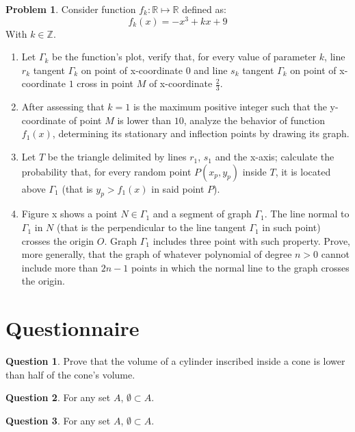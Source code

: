 \documentclass[a4paper,12pt,reqno]{amsart}
\theoremstyle{definition}
\newtheorem{problem}{Problem}
\newtheorem{quest}{Question}
\begin{document}
\begin{problem}
Consider function $f_k: \mathbb{R} \mapsto \mathbb{R}$ defined as:
\begin{equation}
f_k(x)=-x^3+kx+9
\end{equation}
With $k\in\mathbb{Z}$.
\begin{enumerate}
\item Let $\Gamma_k$ be the function's plot, verify that, for every value of parameter $k$, line $r_k$ tangent
$\Gamma_k$ on point of x-coordinate $0$ and line $s_k$ tangent $\Gamma_k$ on point of x-coordinate $1$ cross
in point $M$ of x-coordinate $\frac{2}{3}$.
\item After assessing that $k=1$ is the maximum positive integer such that the y-coordinate of point $M$ is
lower than $10$, analyze the behavior of function $f_1(x)$, determining its stationary and inflection points by
drawing its graph.
\item Let $T$ be the triangle delimited by lines $r_1$, $s_1$ and the x-axis; calculate the probability that,
for every random point $P(x_p,y_p)$ inside $T$, it is located above $\Gamma_1$ (that is $y_p > f_1(x)$ in said
point $P$).
\item Figure x shows a point $N \in \Gamma_1$ and a segment of graph $\Gamma_1$. The line normal to
$\Gamma_1$ in $N$ (that is the perpendicular to the line tangent $\Gamma_1$ in such point) crosses the
origin $O$. Graph $\Gamma_1$ includes three point with such property. Prove, more generally, that the graph
of whatever polynomial of degree $n>0$ cannot include more than $2n-1$ points in which the normal line to the
graph crosses the origin.
\end{enumerate}
\end{problem}

\section{Questionnaire}

\begin{quest}
Prove that the volume of a cylinder inscribed inside a cone is lower than half of the cone's volume.
\end{quest}

\begin{quest}
For any set $A$, $\emptyset \subset A$.
\end{quest}

\begin{quest}
For any set $A$, $\emptyset \subset A$.
\end{quest}
\end{document}
